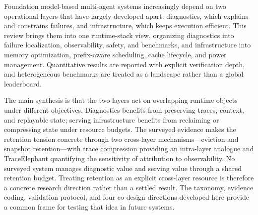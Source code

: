 Foundation model-based multi-agent systems increasingly depend on two operational layers that have largely developed apart: diagnostics, which explains and constrains failures, and infrastructure, which keeps execution efficient. This review brings them into one runtime-stack view, organizing diagnostics into failure localization, observability, safety, and benchmarks, and infrastructure into memory optimization, prefix-aware scheduling, cache lifecycle, and power management. Quantitative results are reported with explicit verification depth, and heterogeneous benchmarks are treated as a landscape rather than a global leaderboard.

The main synthesis is that the two layers act on overlapping runtime objects under different objectives. Diagnostics benefits from preserving traces, context, and replayable state; serving infrastructure benefits from reclaiming or compressing state under resource budgets. The surveyed evidence makes the retention tension concrete through two cross-layer mechanisms---eviction and snapshot retention---with trace compression providing an intra-layer analogue and TraceElephant quantifying the sensitivity of attribution to observability. No surveyed system manages diagnostic value and serving value through a shared retention budget. Treating retention as an explicit cross-layer resource is therefore a concrete research direction rather than a settled result. The taxonomy, evidence coding, validation protocol, and four co-design directions developed here provide a common frame for testing that idea in future systems.
